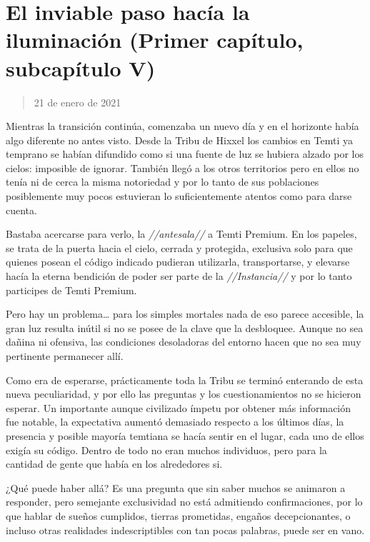 \documentclass[
  spanish,
]{book}
\begin{document}
\hypertarget{el-inviable-paso-hacuxeda-la-iluminaciuxf3n-primer-capuxedtulo-subcapuxedtulo-v}{%
\section{El inviable paso hacía la iluminación (Primer capítulo, subcapítulo V)}\label{el-inviable-paso-hacuxeda-la-iluminaciuxf3n-primer-capuxedtulo-subcapuxedtulo-v}}

\begin{quote}
21 de enero de 2021
\end{quote}

Mientras la transición continúa, comenzaba un nuevo día y en el horizonte había algo diferente no antes visto. Desde la Tribu de Hixxel los cambios en Temti ya temprano se habían difundido como si una fuente de luz se hubiera alzado por los cielos: imposible de ignorar. También llegó a los otros territorios pero en ellos no tenía ni de cerca la misma notoriedad y por lo tanto de sus poblaciones posiblemente muy pocos estuvieran lo suficientemente atentos como para darse cuenta.

Bastaba acercarse para verlo, la \emph{//antesala//} a Temti Premium. En los papeles, se trata de la puerta hacia el cielo, cerrada y protegida, exclusiva solo para que quienes posean el código indicado pudieran utilizarla, transportarse, y elevarse hacía la eterna bendición de poder ser parte de la \emph{//Instancia//} y por lo tanto participes de Temti Premium.

Pero hay un problema\ldots{} para los simples mortales nada de eso parece accesible, la gran luz resulta inútil si no se posee de la clave que la desbloquee. Aunque no sea dañina ni ofensiva, las condiciones desoladoras del entorno hacen que no sea muy pertinente permanecer allí.

Como era de esperarse, prácticamente toda la Tribu se terminó enterando de esta nueva peculiaridad, y por ello las preguntas y los cuestionamientos no se hicieron esperar.
Un importante aunque civilizado ímpetu por obtener más información fue notable, la expectativa aumentó demasiado respecto a los últimos días, la presencia y posible mayoría temtiana se hacía sentir en el lugar, cada uno de ellos exigía su código. Dentro de todo no eran muchos individuos, pero para la cantidad de gente que había en los alrededores si.

¿Qué puede haber allá?
Es una pregunta que sin saber muchos se animaron a responder, pero semejante exclusividad no está admitiendo confirmaciones, por lo que hablar de sueños cumplidos, tierras prometidas, engaños decepcionantes, o incluso otras realidades indescriptibles con tan pocas palabras, puede ser en vano.
\end{document}
